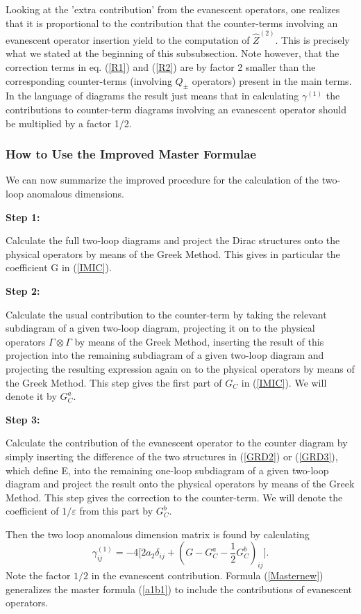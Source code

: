 \documentclass[12pt]{article}
\newcommand{\be}{\begin{equation}}
\newcommand{\ee}{\end{equation}}
\begin{document}
\begin{itemize}
\begin{itemize}
 Looking at the 'extra contribution'
 from the evanescent operators, one realizes that it is proportional
 to the contribution that the counter-terms involving an
 evanescent operator
 insertion yield to the
 computation of $\hat Z^{(2)}$. 
 This 
is precisely what we stated at the beginning of this subsubsection.
 Note however, 
that the correction terms in eq. (\ref{R1}) and (\ref{R2}) 
are by factor 2
 smaller than 
the corresponding counter-terms (involving $Q_\pm$ operators)
 present in the main 
terms. In the language of diagrams the result just means that
in calculating $\gamma^{(1)}$ the 
contributions to counter-term
 diagrams involving an evanescent
 operator should be multiplied by a factor 1/2.

\subsubsection{How to Use the Improved Master Formulae}
We can now summarize the improved procedure for the calculation
of the two-loop anomalous dimensions.

{\bf Step 1:}

Calculate the full two-loop diagrams and project the 
Dirac structures onto the physical operators by means of the
Greek Method. This gives in particular the coefficient G in
(\ref{IMIC}).

{\bf Step 2:}

Calculate the usual contribution to the counter-term by taking
the relevant subdiagram of a given two-loop diagram, 
projecting it on to the physical
operators $\Gamma\otimes\Gamma$ by means of the Greek Method, 
inserting the result
of this projection into the remaining subdiagram  of a given
 two-loop diagram
and projecting the resulting expression again on to the physical
operators by means of the Greek Method.
 This step gives the first part of $G_C$ in (\ref{IMIC}).
We will denote it by $G^a_C$.

\newpage
{\bf Step 3:} 

Calculate the contribution of the evanescent operator to the
counter diagram by simply inserting
the difference of the two structures in (\ref{GRD2}) or
(\ref{GRD3}), which define E,
into the remaining one-loop subdiagram of a given two-loop
diagram and project the result onto the physical operators
by means of the Greek Method. This step gives the correction
to the counter-term. We will denote the coefficient of $1/\varepsilon$
from this part by $G^b_C$.

Then the two loop anomalous dimension matrix is found by calculating
\be\label{Masternew}
\gamma^{(1)}_{ij}= -4 \lbrack 2a_2 \delta_{ij} 
+(G-G^a_C-\frac{1}{2}G^b_C)_{ij}
\rbrack.
\ee 
Note the factor $1/2$ in the evanescent contribution. Formula
(\ref{Masternew}) generalizes the master formula (\ref{a1b1})
to include the contributions of evanescent operators.


\end{itemize}
\end{itemize}
\end{document}
